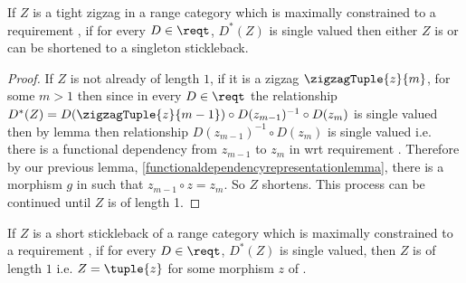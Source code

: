 \begin{lemma}
If $Z$ is a tight zigzag in a range category \catcw which is maximally constrained to a requirement \reqt, if for every $D \in \reqt$, $D^*(Z)$ is single valued
then either $Z$ is or can be shortened to a singleton stickleback.
\end{lemma}
\begin{proof}
If $Z$ is not already of length $1$, if it is a  
zigzag  $\zigzagTuple{z}{m}$, for some 
$m > 1$ then
since in every $D \in \reqt$ the relationship 
$D^*(Z)=D(\zigzagTuple{z}{m-1}) 
    \circ D(z_{m-1})^{-1} \circ D(z_m)$
is single valued then by lemma  then
relationship $D(z_{m-1})^{-1} \circ D(z_m)$ is
single valued i.e. there is a functional dependency 
from $z_{m-1}$ to $z_m$ in \catcw wrt requirement
\reqt. Therefore by our previous 
lemma, \ref{functionaldependencyrepresentationlemma}, there is a morphism $g$ in \catcw such that
$z_{m-1} \circ z = z_m$. So $Z$ shortens. This process can be continued until $Z$ is of length 1. 
\end{proof}

\begin{corollary}
If $Z$ is a short 
stickleback  of a range category \catcw which is maximally constrained to a requirement \reqt, if for every $D \in \reqt$, $D^*(Z)$ is single valued, then
$Z$ is of length $1$ i.e. $Z=\tuple{z}$ for some morphism $z$ of \catcw.
\end{corollary}


